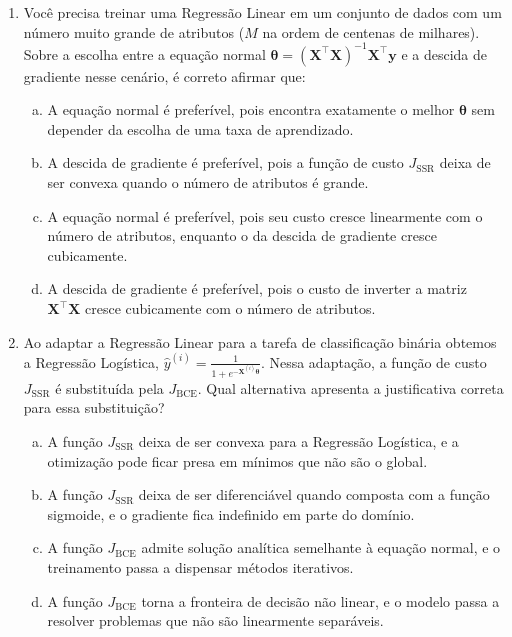 \documentclass{dlproblemset}
\begin{document}
\begin{enumerate}[1)]
    \begin{enumerate}[(a)]
        \item Modelo A.
        \item Modelo B.
        \item Modelo C.
        \item Modelo D.
    \end{enumerate}

    \item Você precisa treinar uma Regressão Linear em um conjunto de dados com um número muito grande de atributos ($M$ na ordem de centenas de milhares). Sobre a escolha entre a equação normal $\boldsymbol{\theta} = (\mathbf{X}^\top\mathbf{X})^{-1}\mathbf{X}^\top\mathbf{y}$ e a descida de gradiente nesse cenário, é correto afirmar que:
    \begin{enumerate}[(a)]
        \item A equação normal é preferível, pois encontra exatamente o melhor $\boldsymbol{\theta}$ sem depender da escolha de uma taxa de aprendizado.
        \item A descida de gradiente é preferível, pois a função de custo $J_{\text{SSR}}$ deixa de ser convexa quando o número de atributos é grande.
        \item A equação normal é preferível, pois seu custo cresce linearmente com o número de atributos, enquanto o da descida de gradiente cresce cubicamente.
        \item A descida de gradiente é preferível, pois o custo de inverter a matriz $\mathbf{X}^\top\mathbf{X}$ cresce cubicamente com o número de atributos.
    \end{enumerate}

    \item Ao adaptar a Regressão Linear para a tarefa de classificação binária obtemos a Regressão Logística, $\hat{y}^{(i)} = \frac{1}{1+e^{-\mathbf{X}^{(i)}\boldsymbol{\theta}}}$. Nessa adaptação, a função de custo $J_{\text{SSR}}$ é substituída pela $J_{\text{BCE}}$. Qual alternativa apresenta a justificativa correta para essa substituição?
    \begin{enumerate}[(a)]
        \item A função $J_{\text{SSR}}$ deixa de ser convexa para a Regressão Logística, e a otimização pode ficar presa em mínimos que não são o global.
        \item A função $J_{\text{SSR}}$ deixa de ser diferenciável quando composta com a função sigmoide, e o gradiente fica indefinido em parte do domínio.
        \item A função $J_{\text{BCE}}$ admite solução analítica semelhante à equação normal, e o treinamento passa a dispensar métodos iterativos.
        \item A função $J_{\text{BCE}}$ torna a fronteira de decisão não linear, e o modelo passa a resolver problemas que não são linearmente separáveis.
    \end{enumerate}


\end{enumerate}
\end{document}
